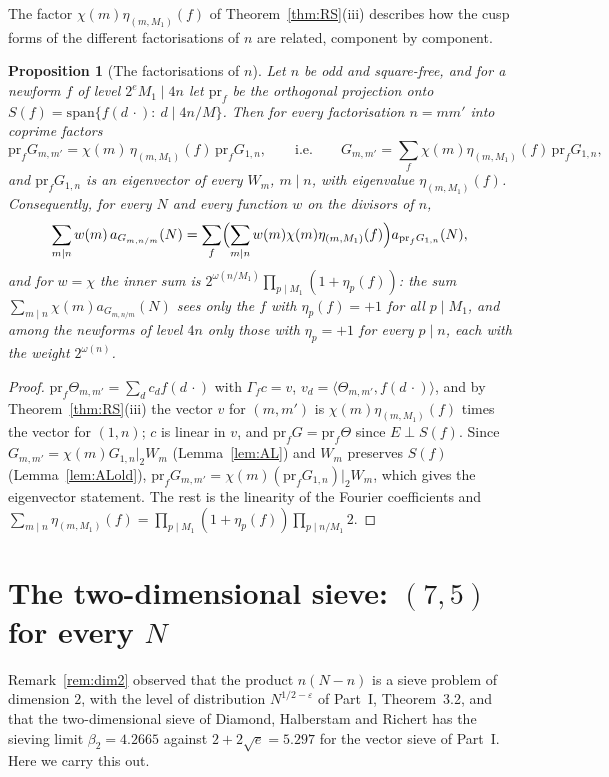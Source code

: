 ﻿\documentclass[11pt]{amsart}
\newtheorem{proposition}[theorem]{Proposition}
\theoremstyle{remark}
\newcommand{\e}{\varepsilon}
\begin{document}
The factor $\chi(m)\eta_{(m,M_1)}(f)$ of Theorem~\ref{thm:RS}(iii) describes how the cusp forms of the different factorisations of $n$ are related, component by component.

\begin{proposition}[The factorisations of $n$]\label{prop:factor}
Let $n$ be odd and square-free, and for a newform $f$ of level $2^eM_1\mid4n$ let $\mathrm{pr}_f$ be the orthogonal projection onto $S(f)=\mathrm{span}\{f(d\,\cdot):\ d\mid4n/M\}$. Then for every factorisation $n=mm'$ into coprime factors
\[
\mathrm{pr}_fG_{m,m'}=\chi(m)\,\eta_{(m,M_1)}(f)\,\mathrm{pr}_fG_{1,n},\qquad\text{i.e.}\qquad G_{m,m'}=\sum_f\chi(m)\eta_{(m,M_1)}(f)\,\mathrm{pr}_fG_{1,n},
\]
and $\mathrm{pr}_fG_{1,n}$ is an eigenvector of every $W_m$, $m\mid n$, with eigenvalue $\eta_{(m,M_1)}(f)$. Consequently, for every $N$ and every function $w$ on the divisors of $n$,
\[
\sum_{m\mid n}w(m)\,a_{G_{m,n/m}}(N)=\sum_f\Bigl(\sum_{m\mid n}w(m)\chi(m)\eta_{(m,M_1)}(f)\Bigr)a_{\mathrm{pr}_fG_{1,n}}(N),
\]
and for $w=\chi$ the inner sum is $2^{\omega(n/M_1)}\prod_{p\mid M_1}(1+\eta_p(f))$: the sum $\sum_{m\mid n}\chi(m)a_{G_{m,n/m}}(N)$ sees only the $f$ with $\eta_p(f)=+1$ for all $p\mid M_1$, and among the newforms of level $4n$ only those with $\eta_p=+1$ for every $p\mid n$, each with the weight $2^{\omega(n)}$.
\end{proposition}
\begin{proof}
$\mathrm{pr}_f\Theta_{m,m'}=\sum_dc_df(d\,\cdot)$ with $\Gamma_fc=v$, $v_d=\langle\Theta_{m,m'},f(d\,\cdot)\rangle$, and by Theorem~\ref{thm:RS}(iii) the vector $v$ for $(m,m')$ is $\chi(m)\eta_{(m,M_1)}(f)$ times the vector for $(1,n)$; $c$ is linear in $v$, and $\mathrm{pr}_fG=\mathrm{pr}_f\Theta$ since $E\perp S(f)$. Since $G_{m,m'}=\chi(m)G_{1,n}|_2W_m$ (Lemma~\ref{lem:AL}) and $W_m$ preserves $S(f)$ (Lemma~\ref{lem:ALold}), $\mathrm{pr}_fG_{m,m'}=\chi(m)(\mathrm{pr}_fG_{1,n})|_2W_m$, which gives the eigenvector statement. The rest is the linearity of the Fourier coefficients and $\sum_{m\mid n}\eta_{(m,M_1)}(f)=\prod_{p\mid M_1}(1+\eta_p(f))\prod_{p\mid n/M_1}2$.
\end{proof}

\section{The two-dimensional sieve: $(7,5)$ for every $N$}\label{sec:dim2}

Remark~\ref{rem:dim2} observed that the product $n(N-n)$ is a sieve problem of dimension $2$, with the level of distribution $N^{1/2-\e}$ of Part~I, Theorem~3.2, and that the two-dimensional sieve of Diamond, Halberstam and Richert has the sieving limit $\beta_2=4.2665$ against $2+2\sqrt e=5.297$ for the vector sieve of Part~I. Here we carry this out.
\end{document}
